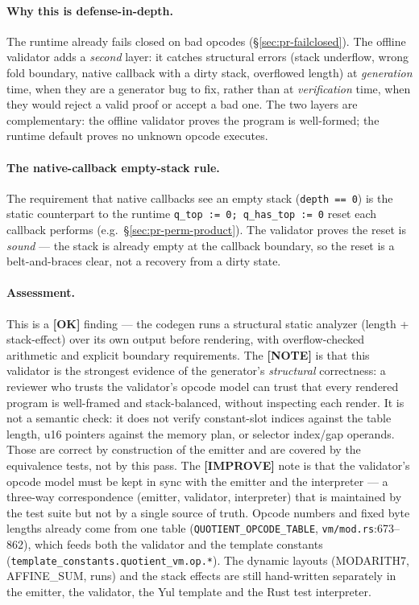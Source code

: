 \paragraph{Why this is defense-in-depth.}
The runtime already fails closed on bad opcodes
(§\ref{sec:pr-failclosed}). The offline validator adds a
\emph{second} layer: it catches structural errors (stack
underflow, wrong fold boundary, native callback with a dirty
stack, overflowed length) at \emph{generation} time, when they
are a generator bug to fix, rather than at \emph{verification}
time, when they would reject a valid proof or accept a bad one.
The two layers are complementary: the offline validator proves
the program is well-formed; the runtime default proves no
unknown opcode executes.

\paragraph{The native-callback empty-stack rule.}
The requirement that native callbacks see an empty stack
(\texttt{depth == 0}) is the static counterpart to the runtime
\texttt{q\_\allowbreak{}top := 0; q\_\allowbreak{}has\_\allowbreak{}top := 0} reset each callback
performs (e.g.\ §\ref{sec:pr-perm-product}). The validator
proves the reset is \emph{sound} --- the stack is already empty
at the callback boundary, so the reset is a belt-and-braces
clear, not a recovery from a dirty state.

\paragraph{Assessment.} This is a
\textcolor{tracegreen}{\textbf{[OK]}} finding --- the codegen
runs a structural static analyzer (length + stack-effect) over its
own output before rendering, with overflow-checked arithmetic and
explicit boundary requirements. The
\textcolor{mathpurple}{\textbf{[NOTE]}} is that this validator
is the strongest evidence of the generator's \emph{structural}
correctness: a reviewer who trusts the validator's opcode model can
trust that every rendered program is well-framed and
stack-balanced, without inspecting each render. It is not a
semantic check: it does not verify constant-slot indices against
the table length, u16 pointers against the memory plan, or
selector index/gap operands. Those are correct by construction of
the emitter and are covered by the equivalence tests, not by this
pass. The
\textcolor{codegenblue}{\textbf{[IMPROVE]}} note is that the
validator's opcode model must be kept in sync with the emitter
and the interpreter --- a three-way correspondence (emitter,
validator, interpreter) that is maintained by the test suite but
not by a single source of truth.  Opcode numbers
and fixed byte lengths already come from one table
(\texttt{QUOTIENT\_\allowbreak{}OPCODE\_\allowbreak{}TABLE}, \texttt{vm/mod.rs}:673--862),
which feeds both the validator and the template constants
(\texttt{template\_\allowbreak{}constants.quotient\_\allowbreak{}vm.op.*}). The dynamic
layouts (MODARITH7, AFFINE\_SUM, runs) and the stack effects are
still hand-written separately in the emitter, the validator, the
Yul template and the Rust test interpreter.

